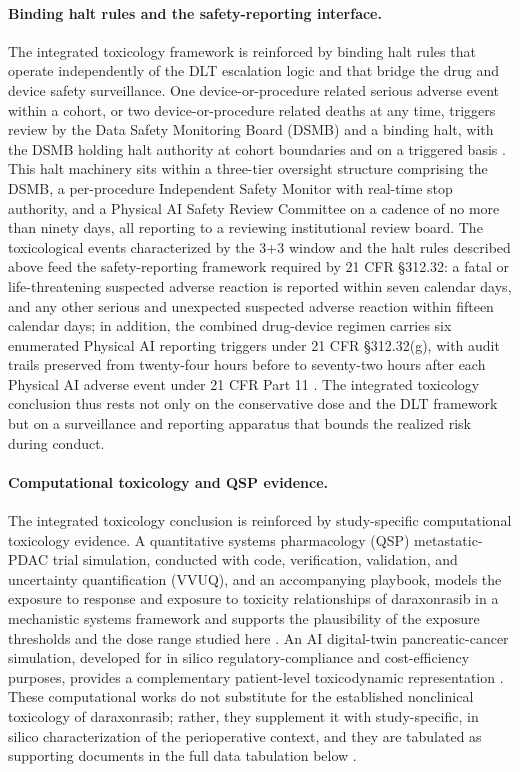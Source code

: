 \paragraph{Binding halt rules and the safety-reporting interface.}
The integrated toxicology framework is reinforced by binding halt rules that
operate independently of the DLT escalation logic and that bridge the drug and
device safety surveillance. One device-or-procedure related serious adverse event
within a cohort, or two device-or-procedure related deaths at any time, triggers
review by the Data Safety Monitoring Board (DSMB) and a binding halt, with the DSMB
holding halt authority at cohort boundaries and on a triggered basis
\cite{onpremwhippl}. This halt machinery sits within a three-tier oversight
structure comprising the DSMB, a per-procedure Independent Safety Monitor with
real-time stop authority, and a Physical AI Safety Review Committee on a cadence of
no more than ninety days, all reporting to a reviewing institutional review board.
The toxicological events characterized by the 3+3 window and the halt rules
described above feed the safety-reporting framework required by 21 CFR \S 312.32:
a fatal or life-threatening suspected adverse reaction is reported within seven
calendar days, and any other serious and unexpected suspected adverse reaction
within fifteen calendar days; in addition, the combined drug-device regimen carries
six enumerated Physical AI reporting triggers under 21 CFR \S 312.32(g), with audit
trails preserved from twenty-four hours before to seventy-two hours after each
Physical AI adverse event under 21 CFR Part 11 \cite{cfr312paiuni,onpremwhippl}.
The integrated toxicology conclusion thus rests not only on the conservative dose
and the DLT framework but on a surveillance and reporting apparatus that bounds the
realized risk during conduct.

\paragraph{Computational toxicology and QSP evidence.}
The integrated toxicology conclusion is reinforced by study-specific computational
toxicology evidence. A quantitative systems pharmacology (QSP) metastatic-PDAC
trial simulation, conducted with code, verification, validation, and uncertainty
quantification (VVUQ), and an accompanying playbook, models the exposure to
response and exposure to toxicity relationships of daraxonrasib in a mechanistic
systems framework and supports the plausibility of the exposure thresholds and
the dose range studied here \cite{qspmetpancre}. An AI digital-twin
pancreatic-cancer simulation, developed for in silico regulatory-compliance and
cost-efficiency purposes, provides a complementary patient-level
toxicodynamic representation \cite{fdadigtwinpc}. These computational works do
not substitute for the established nonclinical toxicology of daraxonrasib;
rather, they supplement it with study-specific, in silico characterization of the
perioperative context, and they are tabulated as supporting documents in the full
data tabulation below \cite{qspmetpancre,fdadigtwinpc}.

